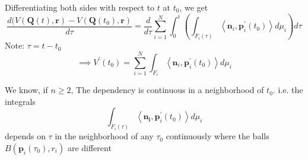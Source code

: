 Differentiating both sides with respect to $t$ at $t_0$, we get 
$$
\frac{d(V(\mathbf{Q}(t), \mathbf{r})-V\left(\mathbf{Q}\left(t_{0}\right), \mathbf{r}\right)}{d \tau} = \frac{d}{d \tau} \sum_{i=1}^{N} \int_{0}^{t} \left( \int_{F_{i}(\tau)} \left\langle \mathbf{n}_i,\mathbf{p}_{i}^{\prime}(t_0) \right\rangle  d \mu_i  \right) d \tau
$$
Note: $\tau = t- t_0$
$$\implies
V^{\prime}\left(t_{0}\right)=\sum_{i=1}^{N} \int_{F_{i}}\left\langle\mathbf{n}_{i}, \mathbf{p}_{i}^{\prime}\left(t_{0}\right)\right\rangle d \mu_{i}
$$

We know, if $n \geq 2$, 
The dependency is continuous in a neighborhood of $t_{0}$.
i.e. the integrals
$$
\int_{F_{i}(\tau)}\left\langle\mathbf{n}_{\mathbf{i}}, \mathbf{p}_{i}^{\prime}\left(t_{0}\right)\right\rangle d \mu_{i}
$$
depends on $\tau$ in the neighborhood of any $\tau_{0}$  continuously where the balls $B\left(\mathbf{p}_{i}\left(\tau_{0}\right), r_{i}\right)$ are different
























































